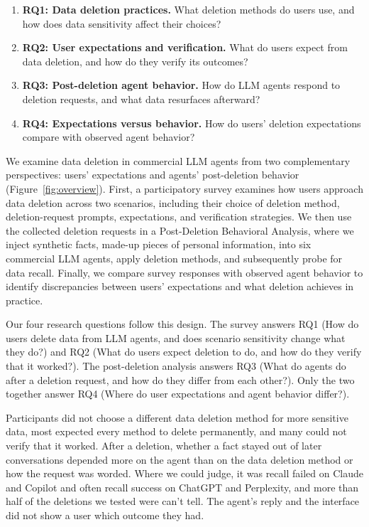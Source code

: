 \begin{enumerate}[leftmargin=4pt,itemindent=0pt,labelsep=0pt]
    \item[] \textbf{RQ1: Data deletion practices.}
    What deletion methods do users use, and how does data sensitivity affect their choices?

    \item[] \textbf{RQ2: User expectations and verification.}
    What do users expect from data deletion, and how do they verify its outcomes?

    \item[] \textbf{RQ3: Post-deletion agent behavior.}
    How do LLM agents respond to deletion requests, and what data resurfaces afterward?

    \item[] \textbf{RQ4: Expectations versus behavior.}
    How do users' deletion expectations compare with observed agent behavior?
\end{enumerate}

We examine data deletion in commercial LLM agents from two complementary perspectives: users' expectations and agents' post-deletion behavior (Figure~\ref{fig:overview}). First, a participatory survey examines how users approach data deletion across two scenarios, including their choice of deletion method, deletion-request prompts, expectations, and verification strategies. We then use the collected deletion requests in a Post-Deletion Behavioral Analysis, where we inject synthetic facts, made-up pieces of personal information, into six commercial LLM agents, apply deletion methods, and subsequently probe for data recall. Finally, we compare survey responses with observed agent behavior to identify discrepancies between users' expectations and what deletion achieves in practice.


Our four research questions follow this design. The survey answers RQ1 (How do users delete data from LLM agents, and does scenario sensitivity change what they do?) and RQ2 (What do users expect deletion to do, and how do they verify that it worked?). The post-deletion analysis answers RQ3 (What do agents do after a deletion request, and how do they differ from each other?). Only the two together answer RQ4 (Where do user expectations and agent behavior differ?).

Participants did not choose a different data deletion method for more sensitive data, most expected every method to delete permanently, and many could not verify that it worked. After a deletion, whether a fact stayed out of later conversations depended more on the agent than on the data deletion method or how the request was worded. Where we could judge, it was recall failed on Claude and Copilot and often recall success on ChatGPT and Perplexity, and more than half of the deletions we tested were can't tell. The agent's reply and the interface did not show a user which outcome they had.

